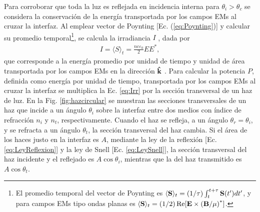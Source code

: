 Para corroborar que toda la luz es reflejada en incidencia interna para $\theta_i>\theta_c$ se considera la conservación de la energía transportada por los campos EMs al cruzar la interfaz. Al emplear vector de Poynting [Ec. (\ref{eq:Poynting})] y calcular su promedio temporal\footnote{El promedio temporal del vector de Poynting es $\langle\vb{S}\rangle_t = (1/\tau)\int_t^{t+\tau}\vb{S}(t')dt'$, y para campos EMs tipo ondas planas es $\langle\vb{S}\rangle_t = (1/2) \Re[\vb{E}\times\qty(\vb{B}/\mu)^*]$.}, se calcula la irradiancia $I$ \cite{hecht1998optics}, dada por
	\begin{align}
	I = \langle S \rangle_t = \frac{nc\varepsilon_0}{2} EE^*,
	\label{eq:Irr}
	\end{align}
que corresponde a la energía promedio por unidad de tiempo y unidad de área  transportada por los campos EMs en la dirección $\vu{k}$ \cite{griffiths2013electrodynamics}. Para calcular la potencia $P$, definida como energía por unidad de tiempo, transportada por los campos EMs al cruzar la interfaz se multiplica la Ec. \eqref{eq:Irr} por la sección transversal de un haz de luz. En la Fig. \ref{fig:hazcircular} se muestran las secciones transversales de un haz  que incide a un ángulo $\theta_i$ sobre la interfaz entre dos medios con índice de refracción $n_i$ y $n_t$, respectivamente. Cuando el haz se refleja, a un ángulo $\theta_r=\theta_i$, y se refracta a un ángulo $\theta_t$, la sección transversal del haz cambia. Si el área de los haces justo en la interfaz es $A$, mediante la ley de la reflexión [Ec. \eqref{eq:LeyReflexion}] y la ley de Snell [Ec. \eqref{eq:LeySnell}], la sección transversal del haz incidente y el reflejado  es $A\cos\theta_i$, mientras que la del haz transmitido es $A\cos\theta_t$.

